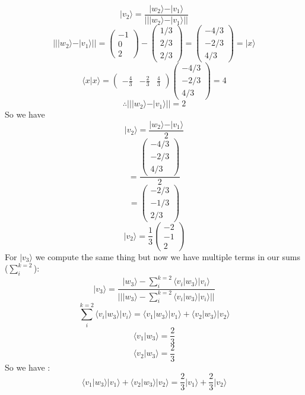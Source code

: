 \documentclass[12pt]{article}
\newcommand{\ket}[1]{\vert{#1}\rangle}
\begin{document}
\begin{enumerate}
$$\ket{v_2} = \frac{\ket{w_2} -  \ket{v_1}}{||\ket{w_2} -  \ket{v_1} ||} $$
$$ || \ket{w_2} - \ket{v_1} || = \left( \begin{array}{ccc} -1 \\ 0 \\ 2\end{array} \right) - \left( \begin{array}{ccc} 1/3 \\ 2/3 \\ 2/3\end{array} \right) = \left( \begin{array}{ccc} -4/3 \\ -2/3 \\ 4/3\end{array} \right) = \ket{x} $$
$$ \langle x | x \rangle = \left( \begin{array}{ccc} -\frac{4}{3} & -\frac{2}{3} &\frac{4}{3} \end{array}\right) \left( \begin{array}{ccc} -4/3 \\ -2/3 \\ 4/3\end{array} \right) = 4 $$
$$ \therefore ||\ket{w_2} - \ket{v_1} || = 2 $$
So we have
$$ \ket{v_2} = \frac{\ket{w_2} - \ket{v_1} } {2} $$
$$ = \frac{\left( \begin{array}{ccc} -4/3 \\ -2/3 \\ 4/3\end{array} \right)}{2} $$
$$ = \left( \begin{array}{ccc} -2/3 \\ -1/3 \\ 2/3\end{array} \right) $$
$$ \ket{v_2} = \frac{1}{3} \left( \begin{array}{ccc} -2 \\ -1 \\ 2\end{array} \right) $$ %
For $\ket{v_3}$ we compute the same thing but now we have multiple terms in our sums ($\sum_i^{k=2}$):
$$ \ket{v_3} = \frac{\ket{w_3} - \sum_i^{k=2} \langle v_i | w_3 \rangle \ket{v_i}}{||\ket{w_3} - \sum_i^{k=2} \langle v_i | w_3 \rangle \ket{v_i}||} $$
$$  \sum_i^{k=2} \langle v_i | w_3 \rangle \ket{v_i} = \langle v_1|w_3\rangle\ket{v_1} + \langle v_2|w_3\rangle \ket{v_2} $$
$$ \langle v_1 | w_3\rangle = \frac{2}{3} $$
$$ \langle v_2 | w_3 \rangle = \frac{2}{3} $$
So we have :
$$ \langle v_1|w_3\rangle\ket{v_1} + \langle v_2|w_3\rangle \ket{v_2} = \frac{2}{3} \ket{v_1} + \frac{2}{3} \ket{v_2} $$

\end{enumerate}
\end{document}
